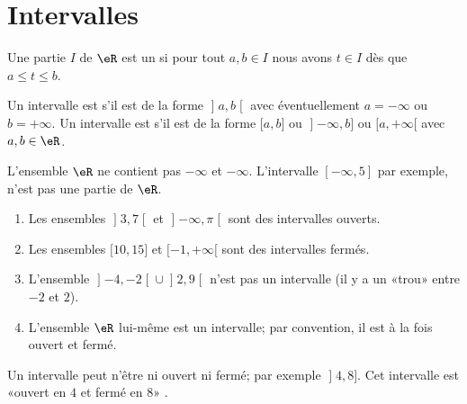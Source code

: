 
\section{Intervalles}

\begin{definition}[Intervalle]
    Une partie \( I\) de \( \eR\) est un  si pour tout \( a,b\in I\) nous avons \( t\in I\) dès que \( a\leq t\leq b\).

    Un intervalle est  s'il est de la forme \( \mathopen] a , b \mathclose[\) avec éventuellement \( a=-\infty\) ou \( b=+\infty\). Un intervalle est  s'il est de la forme \( \mathopen[ a , b \mathclose]\) ou \( \mathopen] -\infty , b \mathclose]\) ou \( \mathopen[ a , +\infty [\) avec \( a,b\in \eR\).
\end{definition}

\begin{remark}
  L'ensemble $\eR$ ne contient pas $-\infty$ et $-\infty$. L'intervalle $[-\infty, 5]$ par exemple, n'est pas une partie de $\eR$.
\end{remark}

\begin{example}
    \begin{enumerate}
        \item
        Les ensembles \( \mathopen] 3 , 7 \mathclose[\) et \( \mathopen] -\infty , \pi \mathclose[\) sont des intervalles ouverts.
        \item
            Les ensembles \( \mathopen[ 10 , 15 \mathclose]\) et \( \mathopen[ -1 , +\infty [\) sont des intervalles fermés.
        \item
        L'ensemble \( \mathopen] -4 , -2 \mathclose[\cup\mathopen] 2 , 9 \mathclose[\) n'est pas un intervalle (il y a un «trou» entre \(- 2\) et \( 2\)).
        \item
            L'ensemble \( \eR\) lui-même est un intervalle; par convention, il est à la fois ouvert et fermé.
    \end{enumerate}
Un intervalle peut n'être ni ouvert ni fermé; par exemple \( \mathopen] 4 , 8 \mathclose]\). Cet intervalle est «ouvert en \( 4\) et fermé en \( 8\)» .
\end{example}

